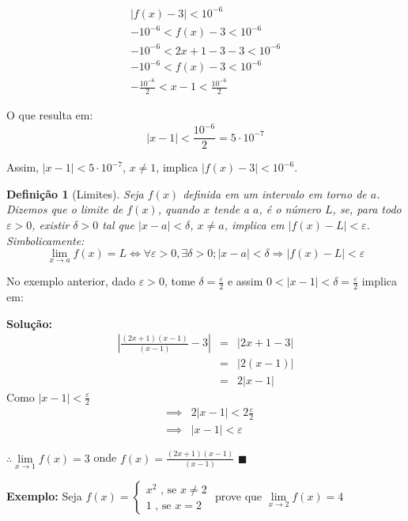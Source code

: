 \documentclass[oneside,a4paper,12pt]{article}
\newtheorem{definition}{Definição}[section]
\begin{document}
\begin{eqnarray*}
|f(x) -3| < 10^{-6} \\
-10^{-6}	< f(x) - 3	<	10^{-6} \\
-10^{-6}	< 2x+1-3 - 3	<	10^{-6} \\
-10^{-6}	< f(x) - 3	<	10^{-6} \\
-\frac{10^{-6}}{2} < x - 1 < \frac{10^{-6}}{2} 
\end{eqnarray*}

O que resulta em:
$$|x-1| < \frac{10^{-6}}{2} = 5 \cdot 10^{-7}$$

Assim, $|x-1|<5 \cdot 10^{-7}$, $x \neq 1$, implica $|f(x) - 3| < 10^{-6}$.

\begin{definition}[Limites]
	Seja $f(x)$ definida em um intervalo em torno de $a$. Dizemos que o limite de $f(x)$, quando $x$ tende a $a$, é o número $L$, se, para todo $\varepsilon > 0$, existir $\delta > 0$ tal que $|x-a|< \delta$, $x \neq a$, implica em $|f(x)-L|<\varepsilon$. Simbolicamente:
	$$\lim\limits_{x \rightarrow a}f(x) = L \Leftrightarrow \forall \varepsilon > 0, \exists \delta > 0 ; |x-a| < \delta \Rightarrow |f(x) - L| < \varepsilon$$
\end{definition}

No exemplo anterior, dado $\varepsilon > 0$, tome $\delta = \displaystyle \frac{\varepsilon}{2}$ e assim $0 < |x-1| < \delta = \displaystyle \frac{\varepsilon}{2}$ implica em:

{\bf Solução:}
\begin{eqnarray*}
	\left| \displaystyle \frac{(2x+1)(x-1)}{(x-1)} - 3 \right| & = & |2x + 1 -3| \\
	& = & |2(x-1)| \\
	& = & 2|x-1|
\end{eqnarray*}
Como $|x-1| < \displaystyle \frac{\varepsilon}{2}$
\begin{eqnarray*}
	& \implies & 2|x-1| < 2 \displaystyle \frac{\varepsilon}{2} \\
	& \implies & |x-1| < \varepsilon
\end{eqnarray*}

$\therefore \lim\limits_{x \rightarrow 1}f(x) = 3$ onde $f(x) = \displaystyle \frac{(2x+1)(x-1)}{(x-1)}$ $\blacksquare$

{\bf Exemplo:} Seja $f(x) = \begin{cases}
x^2 \text{ , se } x \neq 2 \\
1 \text{ , se } x = 2
\end{cases}
$
prove que $\lim\limits_{x \rightarrow 2}f(x) = 4$
\end{document}
